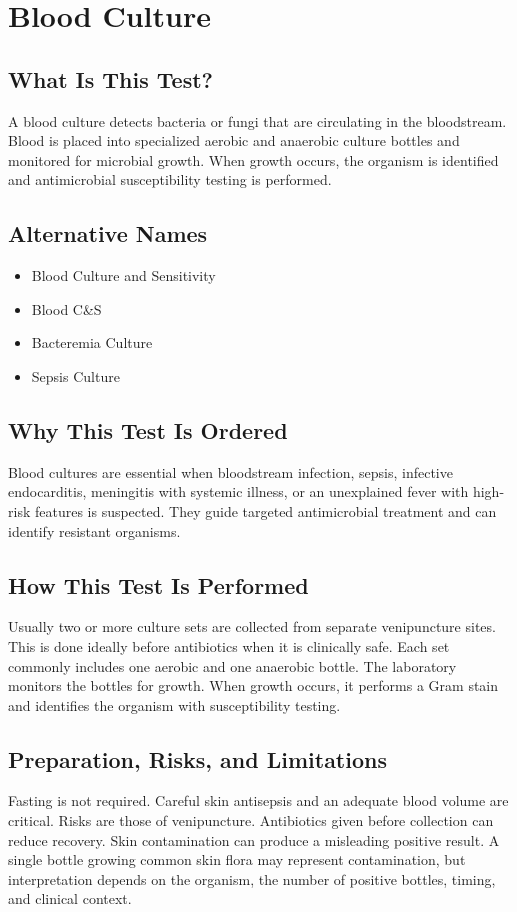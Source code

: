\chapter{Blood Culture}

\section*{What Is This Test?}
A blood culture detects bacteria or fungi that are circulating in the bloodstream. Blood is placed into specialized aerobic and anaerobic culture bottles and monitored for microbial growth. When growth occurs, the organism is identified and antimicrobial susceptibility testing is performed.

\section*{Alternative Names}
\begin{itemize}
  \item Blood Culture and Sensitivity
  \item Blood C\&S
  \item Bacteremia Culture
  \item Sepsis Culture
\end{itemize}
\section*{Why This Test Is Ordered}
Blood cultures are essential when bloodstream infection, sepsis, infective endocarditis, meningitis with systemic illness, or an unexplained fever with high-risk features is suspected. They guide targeted antimicrobial treatment and can identify resistant organisms.

\section*{How This Test Is Performed}
Usually two or more culture sets are collected from separate venipuncture sites. This is done ideally before antibiotics when it is clinically safe. Each set commonly includes one aerobic and one anaerobic bottle. The laboratory monitors the bottles for growth. When growth occurs, it performs a Gram stain and identifies the organism with susceptibility testing.

\section*{Preparation, Risks, and Limitations}
Fasting is not required. Careful skin antisepsis and an adequate blood volume are critical. Risks are those of venipuncture. Antibiotics given before collection can reduce recovery. Skin contamination can produce a misleading positive result. A single bottle growing common skin flora may represent contamination, but interpretation depends on the organism, the number of positive bottles, timing, and clinical context.

